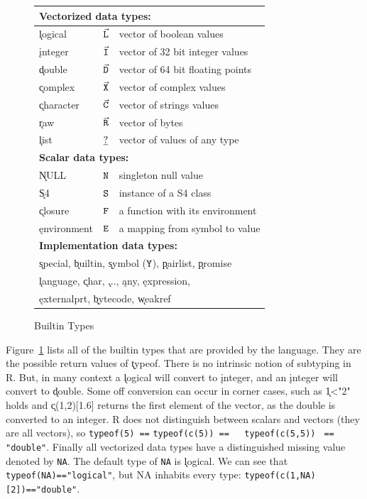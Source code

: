 \documentclass[acmsmall,review,anonymous]{acmart}\settopmatter{printfolios=true,printccs=false,printacmref=false}
\newcommand{\code}[1]{{\lstinline[style=Rin]!#1!}\xspace}
\newcommand{\D}{\ensuremath{\small\vec{\mathtt D}}\xspace} %
\newcommand{\I}{\ensuremath{\small\vec{\mathtt I}}\xspace} %
\renewcommand{\C}{\ensuremath{\small\vec{\mathtt C}}\xspace} %
\renewcommand{\L}{\ensuremath{\small\vec{\mathtt L}}\xspace} %
\newcommand{\R}{\ensuremath{\small\vec{\mathtt R}}\xspace} %
\newcommand{\X}{\ensuremath{\small\vec{\mathtt X}}\xspace} %
\newcommand{\sY}{\ensuremath{\small{\mathtt Y}}\xspace} %
\newcommand{\sS}{\ensuremath{\small{\mathtt S}}\xspace} %
\newcommand{\sF}{\ensuremath{\small{\mathtt F}}\xspace} %
\newcommand{\sE}{\ensuremath{\small{\mathtt E}}\xspace} %
\renewcommand{\R}{\ensuremath{\small\vec{\mathtt R}}\xspace} %
\newcommand{\sN}{\ensuremath{\small{\mathtt N}}\xspace}     %
\renewcommand{\l}{\ensuremath{\small\underline{\mathtt ?}}\xspace}     %
\begin{document}
\begin{figure}
\footnotesize\begin{tabular}{l|c|l@{}}\hline
\multicolumn{3}{l}{\bf Vectorized data types:}  \\\hline
\k{logical}   & \L & vector of boolean values\\
\k{integer}   & \I & vector of 32 bit integer values\\
\k{double}    & \D & vector of 64 bit floating points\\
\k{complex}   & \X & vector of complex values\\
\k{character} & \C & vector of strings values\\
\k{raw}       & \R & vector of bytes\\
\k{list}      & \l & vector of values of any type\\\hline
\multicolumn{3}{l}{\bf Scalar data types:}\\\hline
\k{NULL}      & \sN &  singleton null value\\
\k{S4}        & \sS &  instance of a S4 class \\
\k{closure}   & \sF & a function with its environment\\
\k{environment}&\sE &  a mapping from symbol to value \\\hline
\multicolumn{3}{l}{\bf Implementation data types:}\\\hline
\multicolumn{3}{l}{\k{special},
\k{builtin},
\k{symbol} (\sY),
\k{pairlist},
\k{promise}}\\
\multicolumn{3}{l}{
\k{language},
\k{char},
\k{...},
\k{any},
\k{expression},
}\\
\multicolumn{3}{l}{
\k{externalprt},
\k{bytecode},
\k{weakref}}\\\hline
\end{tabular}\caption{Builtin Types}\label{types}\end{figure}

Figure~\ref{types} lists all of the builtin types that are provided by the
language. They are the possible return values of \k{typeof}. There is no
intrinsic notion of subtyping in R. But, in many context a \k{logical} will
convert to \k{integer}, and an \k{integer} will convert to \k{double}.  Some
off conversion can occur in corner cases, such as \k{1<"2"} holds and
\k{c(1,2)[1.6]} returns the first element of the vector, as the double is
converted to an integer. R does not distinguish between scalars and vectors
(they are all vectors), so \code{typeof(5) ==} \code{typeof(c(5)) ==
  typeof(c(5,5))} \code{ == "double"}. Finally all vectorized data types have a
distinguished missing value denoted by \code{NA}. The default type of
\code{NA} is \k{logical}. We can see that \code{typeof(NA)=="logical"}, but
NA inhabits every type: \code{typeof(c(1,NA)[2])=="double"}.
\end{document}
